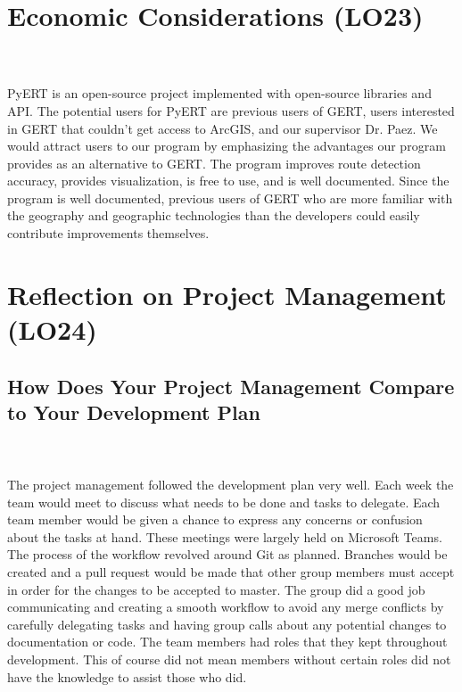 \documentclass{article}
\begin{document}
 

\section{Economic Considerations (LO23)}

\\ \\
PyERT is an open-source project implemented with open-source libraries and API. The potential users for PyERT are previous users of GERT, users interested in GERT that couldn't get access to ArcGIS, and our supervisor Dr. Paez. We would attract users to our program by emphasizing the advantages our program provides as an alternative to GERT. The program improves route detection accuracy, provides visualization, is free to use, and is well documented. Since the program is well documented, previous users of GERT who are more familiar with the geography and geographic technologies than the developers could easily contribute improvements themselves.

\section{Reflection on Project Management (LO24)}


\subsection{How Does Your Project Management Compare to Your Development Plan}

\\ \\ 
The project management followed the development plan very well. Each week the team would meet to discuss what needs to be done and tasks to delegate. Each team member would be given a chance to express any concerns or confusion about the tasks at hand. These meetings were largely held on Microsoft Teams. The process of the workflow revolved around Git as planned. Branches would be created and a pull request would be made that other group members must accept in order for the changes to be accepted to master. The group did a good job communicating and creating a smooth workflow to avoid any merge conflicts by carefully delegating tasks and having group calls about any potential changes to documentation or code. The team members had roles that they kept throughout development. This of course did not mean members without certain roles did not have the knowledge to assist those who did. 
\end{document}
